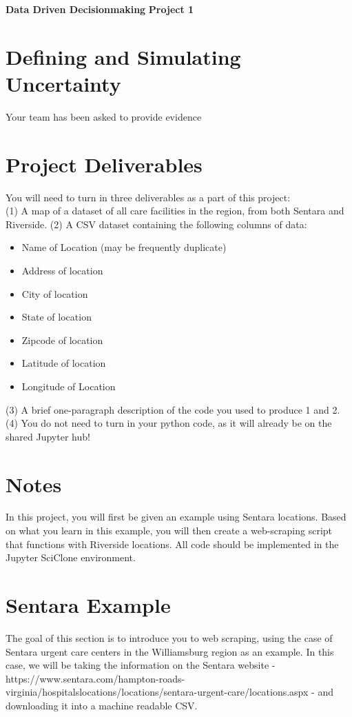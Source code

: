 \documentclass[a4paper, 11pt]{article}
\begin{document}
\noindent
\large\textbf{Data Driven Decisionmaking} \hfill \textbf{Project 1} \\

\section*{Defining and Simulating Uncertainty}
Your team has been asked to provide evidence 

\section{Project Deliverables}
You will need to turn in three deliverables as a part of this project:\\
(1) A map of a dataset of all care facilities in the region, from both Sentara and Riverside.
(2) A CSV dataset containing the following columns of data: \\
\begin{itemize}
\item Name of Location (may be frequently duplicate)
\item Address of location
\item City of location
\item State of location
\item Zipcode of location
\item Latitude of location
\item Longitude of Location
\end{itemize}
(3) A brief one-paragraph description of the code you used to produce 1 and 2.\\
(4) You do not need to turn in your python code, as it will already be on the shared Jupyter hub!

\section{Notes}
In this project, you will first be given an example using Sentara locations.  Based on what you learn in this example, you will then create a web-scraping script that functions with Riverside locations.  All code should be implemented in the Jupyter SciClone environment.

\section{Sentara Example}
The goal of this section is to introduce you to web scraping, using the case of Sentara urgent care centers in the Williamsburg region as an example.  In this case, we will be taking the information on the Sentara website - https://www.sentara.com/hampton-roads-virginia/hospitalslocations/locations/sentara-urgent-care/locations.aspx - and downloading it into a machine readable CSV.  
\end{document}
